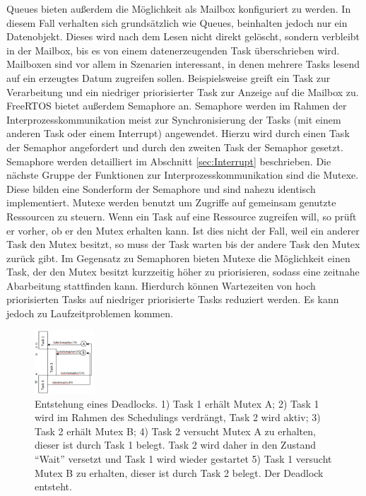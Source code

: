 Queues bieten außerdem die Möglichkeit als Mailbox konfiguriert zu werden. In diesem Fall verhalten sich grund\-sätz\-lich wie Queues, beinhalten jedoch nur ein Datenobjekt. Dieses wird nach dem Lesen nicht direkt gelöscht, sondern verbleibt in der Mailbox, bis es von einem datenerzeugenden Task über\-schrie\-ben wird. Mailboxen sind vor allem in Szenarien interessant, in denen mehrere Tasks lesend auf ein erzeugtes Datum zugreifen sollen. Beispielsweise greift ein Task zur Verarbeitung und ein niedriger priorisierter Task zur Anzeige auf die Mailbox zu\cite[p.143ff]{MasteringFreeRtos}.
\newline
FreeRTOS bietet außerdem Semaphore an. Semaphore werden im Rahmen der Interprozesskommunikation meist zur Synchronisierung der Tasks (mit einem anderen Task oder einem Interrupt) angewendet. 
Hierzu wird durch einen Task der Semaphor angefordert und durch den zweiten Task der Semaphor gesetzt. Semaphore werden detailliert im Abschnitt \ref{sec:Interrupt} beschrieben.
\newline
Die nächste Gruppe der Funktionen zur Interprozesskommunikation sind die Mutexe. Diese bilden eine Sonderform der Semaphore und sind nahezu identisch implementiert. 
Mutexe werden benutzt um Zugriffe auf gemeinsam genutzte Ressourcen zu steuern. Wenn ein Task auf eine Ressource zugreifen will, so prüft er vorher, ob er den Mutex erhalten kann. Ist dies nicht der Fall, weil ein anderer Task den Mutex besitzt, so muss der Task warten bis der andere Task den Mutex zurück gibt. 
Im Gegensatz zu Semaphoren bieten Mutexe die Möglichkeit einen Task, der den Mutex besitzt kurzzeitig höher zu priorisieren, sodass eine zeitnahe Abarbeitung stattfinden kann. Hierdurch können Wartezeiten von hoch priorisierten Tasks auf niedriger priorisierte Tasks reduziert werden. Es kann jedoch zu Laufzeitproblemen kommen.  
\begin{figure}[ht!]
	\centering
		\includegraphics[width=0.2\textwidth]{Pictures/Intertask/Deadlock.png}
	\caption{Entstehung eines Deadlocks. 1) Task 1 erhält Mutex A; 2) Task 1 wird im Rahmen des Schedulings verdrängt, Task 2 wird aktiv; 3) Task 2 erhält Mutex B; 4) Task 2 versucht Mutex A zu erhalten, dieser ist durch Task 1 belegt. Task 2 wird daher in den Zustand "`Wait"' versetzt und Task 1 wird wieder gestartet 5) Task 1 versucht Mutex B zu erhalten, dieser ist durch Task 2 belegt. Der Deadlock entsteht.}
	\label{fig:Deadlock}
\end{figure}

